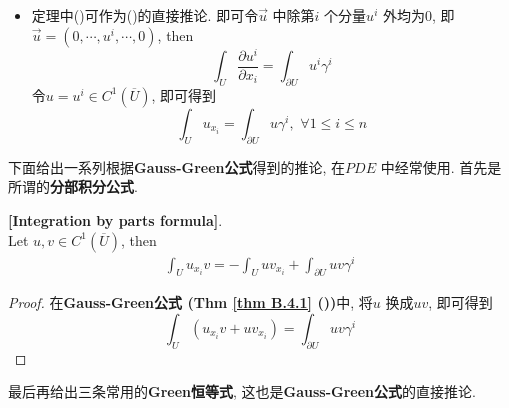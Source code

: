 \begin{thm}
\begin{rmk}
\begin{itemize}
				\vspace{6em}
			
				\item 定理中()可作为()的直接推论. 即可令$\vec{u}$ 中除第$i$ 个分量$u^i$ 外均为0, 即$\vec{u} = (0 , \cdots , u^i , \cdots , 0)$, then
				\[ \int_{U} \frac{\partial u^i}{\partial x_i} = \int_{\partial U} u^i \gamma^i \]
				令$u = u^i \in C^{1}(\overline{U})$, 即可得到
				\[ \int_{U} u_{x_i} = \int_{\partial U} u \gamma^i , \,\, \forall 1 \leq i \leq n \]
			\end{itemize}
		\end{rmk}
	\end{thm}

	\vspace{11em}

	下面给出一系列根据\textbf{Gauss-Green公式}得到的推论, 在$PDE$ 中经常使用. 首先是所谓的\textbf{分部积分公式}.

	\begin{corollary}\label{cor B.4.2}
		\textbf{[Integration by parts formula]}. \\
			Let $u , v \in C^{1}(\overline{U})$, then
		\begin{align}
			\int_{U} u_{x_i} v = -\int_{U} u v_{x_i} + \int_{\partial U} u v \gamma^i
		\end{align}
	
		\vspace{6em}
	
		\begin{proof}
			在\textbf{Gauss-Green公式 (Thm \ref{thm B.4.1} ())}中, 将$u$ 换成$uv$, 即可得到
			\[ \int_{U} (u_{x_i}v + u v_{x_i}) = \int_{\partial U} u v \gamma^i \]
		\end{proof}
	\end{corollary}

	\newpage

	最后再给出三条常用的\textbf{Green恒等式}, 这也是\textbf{Gauss-Green公式}的直接推论.

